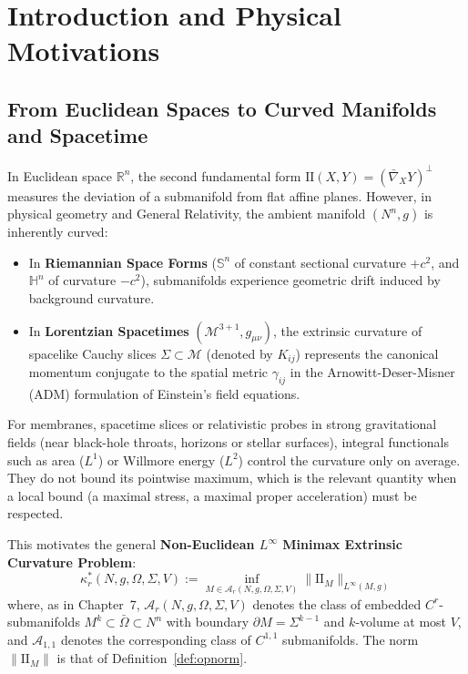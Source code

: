 \documentclass[11pt,reqno]{amsart}
\theoremstyle{definition}
\providecommand{\R}{\mathbb{R}}
\providecommand{\Hyp}{\mathbb{H}}
\providecommand{\Sph}{\mathbb{S}}
\providecommand{\II}{\mathrm{I\!I}}
\numberwithin{equation}{section}
\providecommand{\Hyp}{\mathbb{H}}
\providecommand{\Sph}{\mathbb{S}}
\providecommand{\II}{\mathrm{II}}
\providecommand{\R}{\mathbb{R}}
\begin{document}
\maketitle

\tableofcontents
\newpage

\section{Introduction and Physical Motivations}

\subsection{From Euclidean Spaces to Curved Manifolds and Spacetime}
In Euclidean space $\R^n$, the second fundamental form $\II(X,Y) = (\bar{\nabla}_X Y)^\perp$ measures the deviation of a submanifold from flat affine planes. However, in physical geometry and General Relativity, the ambient manifold $(N^n, g)$ is inherently curved:
\begin{itemize}
    \item In \textbf{Riemannian Space Forms} ($\Sph^n$ of constant sectional curvature $+c^2$, and $\Hyp^n$ of curvature $-c^2$), submanifolds experience geometric drift induced by background curvature.
    \item In \textbf{Lorentzian Spacetimes} $(\mathcal{M}^{3+1}, g_{\mu\nu})$, the extrinsic curvature of spacelike Cauchy slices $\Sigma \subset \mathcal{M}$ (denoted by $K_{ij}$) represents the canonical momentum conjugate to the spatial metric $\gamma_{ij}$ in the Arnowitt-Deser-Misner (ADM) formulation of Einstein's field equations.
\end{itemize}

For membranes, spacetime slices or relativistic probes in strong gravitational fields (near black-hole throats, horizons or stellar surfaces), integral functionals such as area ($L^1$) or Willmore energy ($L^2$) control the curvature only on average. They do not bound its pointwise maximum, which is the relevant quantity when a local bound (a maximal stress, a maximal proper acceleration) must be respected.

This motivates the general \textbf{Non-Euclidean $L^\infty$ Minimax Extrinsic Curvature Problem}:
\begin{equation}
\label{eq:noneuclidean_problem}
\kappa^*_r(N, g, \Omega, \Sigma, V) := \inf_{M \in \mathcal{A}_r(N, g, \Omega, \Sigma, V)} \|\II_M\|_{L^\infty(M, g)}
\end{equation}
where, as in Chapter~7, $\mathcal{A}_r(N, g, \Omega, \Sigma, V)$ denotes the class of embedded $C^r$-submanifolds $M^k \subset \bar{\Omega} \subset N^n$ with boundary $\partial M = \Sigma^{k-1}$ and $k$-volume at most $V$, and $\mathcal{A}_{1,1}$ denotes the corresponding class of $C^{1,1}$ submanifolds. The norm $\|\II_M\|$ is that of Definition~\ref{def:opnorm}.
\end{document}
